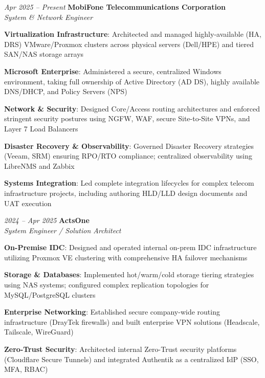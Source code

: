 \begin{twocolentry}{\textit{Apr 2025 -- Present}}
    \textbf{MobiFone Telecommunications Corporation} \\[4pt]
    \textit{System \& Network Engineer}
\end{twocolentry}
\begin{onecolentry}
    \begin{highlights}
        \item \textbf{Virtualization Infrastructure}: Architected and managed highly-available (HA, DRS) VMware/Proxmox clusters across physical servers (Dell/HPE) and tiered SAN/NAS storage arrays
        \item \textbf{Microsoft Enterprise}: Administered a secure, centralized Windows environment, taking full ownership of Active Directory (AD DS), highly available DNS/DHCP, and Policy Servers (NPS)
        \item \textbf{Network \& Security}: Designed Core/Access routing architectures and enforced stringent security postures using NGFW, WAF, secure Site-to-Site VPNs, and Layer 7 Load Balancers
        \item \textbf{Disaster Recovery \& Observability}: Governed Disaster Recovery strategies (Veeam, SRM) ensuring RPO/RTO compliance; centralized observability using LibreNMS and Zabbix
        \item \textbf{Systems Integration}: Led complete integration lifecycles for complex telecom infrastructure projects, including authoring HLD/LLD design documents and UAT execution
    \end{highlights}
\end{onecolentry}
\vspace{0.2 cm}

\begin{twocolentry}{\textit{2024 -- Apr 2025}}
    \textbf{ActsOne} \\[4pt]
    \textit{System Engineer / Solution Architect}
\end{twocolentry}
\begin{onecolentry}
    \begin{highlights}
        \item \textbf{On-Premise IDC}: Designed and operated internal on-prem IDC infrastructure utilizing Proxmox VE clustering with comprehensive HA failover mechanisms
        \item \textbf{Storage \& Databases}: Implemented hot/warm/cold storage tiering strategies using NAS systems; configured complex replication topologies for MySQL/PostgreSQL clusters
        \item \textbf{Enterprise Networking}: Established secure company-wide routing infrastructure (DrayTek firewalls) and built enterprise VPN solutions (Headscale, Tailscale, WireGuard)
        \item \textbf{Zero-Trust Security}: Architected internal Zero-Trust security platforms (Cloudflare Secure Tunnels) and integrated Authentik as a centralized IdP (SSO, MFA, RBAC)
    \end{highlights}
\end{onecolentry}
\vspace{0.2 cm}

